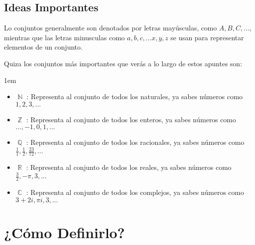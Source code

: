 \documentclass[12pt, fleqn]{report}                             %
\newenvironment{SmallIndentation}[1][0.75em]                    %
    {\begin{adjustwidth}{#1}{}\begin{footnotesize}}                 %
    {\end{footnotesize}\end{adjustwidth}}                           %
\DeclareMathOperator \Naturals  {\mathbb{N}}                     %
\DeclareMathOperator \Integers  {\mathbb{Z}}                     %
\DeclareMathOperator \Racionals {\mathbb{Q}}                     %
\DeclareMathOperator \Reals     {\mathbb{R}}                     %
\DeclareMathOperator \Complexs  {\mathbb{C}}                     %
\begin{document}
            \subsection*{Ideas Importantes}

            Lo conjuntos generalmente son denotados por letras mayúsculas, como $A, B, C, \dots$, mientras
            que las letras minusculas como $a, b, c, \dots x, y, z$ se usan para representar elementos
            de un conjunto.


            Quiza los conjuntos más importantes que verás a lo largo de estos apuntes son:

            \begin{SmallIndentation}[1em]
            \begin{itemize}
                \item $\Naturals$ : Representa al conjunto de todos los naturales, ya sabes
                        números como $1, 2, 3, \dots$
                \item $\Integers$ : Representa al conjunto de todos los enteros, ya sabes
                        números como $\dots, -1, 0, 1, \dots$
                \item $\Racionals$ : Representa al conjunto de todos los racionales, ya sabes
                        números como $\frac{1}{1}, \frac{1}{2}, \frac{23}{72}, \dots$
                \item $\Reals$ : Representa al conjunto de todos los reales, ya sabes
                        números como $\frac{3}{2}, -\pi, 3, \dots$
                \item $\Complexs$ : Representa al conjunto de todos los complejos, ya sabes
                        números como $3 + 2i, \pi i, 3, \dots$
            \end{itemize}
            \end{SmallIndentation}
                




        \clearpage
        \section{¿Cómo Definirlo?}
\end{document}

